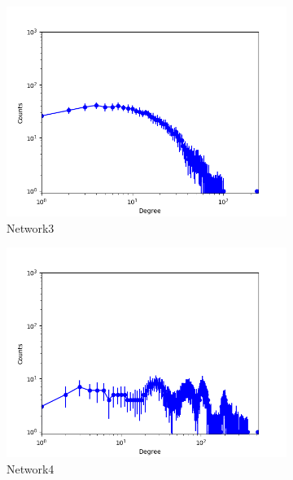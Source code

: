 \begin{figure}[h]
\begin{subfigure}[b]{0.300\textwidth}
            \centering
            \includegraphics[width=\textwidth]{img/corpus/ilfm_network3_0}
            \caption {{\small Network3}}    
        \end{subfigure}
        \begin{subfigure}[b]{0.300\textwidth}
            \centering
            \includegraphics[width=\textwidth]{img/corpus/ilfm_network4_0}
            \caption {{\small Network4}}    
        \end{subfigure}
        \begin{subfigure}[b]{0.300\textwidth}
            \centering

\end{subfigure}
\end{figure}
